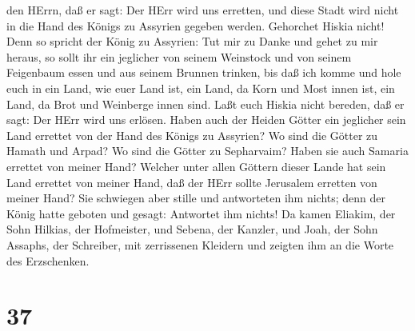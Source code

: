 den HErrn, daß er sagt: Der HErr wird uns erretten, und diese Stadt wird
nicht in die Hand des Königs zu Assyrien gegeben werden. 
Gehorchet Hiskia nicht! Denn so spricht der König zu Assyrien: Tut mir
zu Danke und gehet zu mir heraus, so sollt ihr ein jeglicher von seinem
Weinstock und von seinem Feigenbaum essen und aus seinem Brunnen
trinken,  bis daß ich komme und hole euch in ein Land, wie
euer Land ist, ein Land, da Korn und Most innen ist, ein Land, da Brot
und Weinberge innen sind.  Laßt euch Hiskia nicht bereden,
daß er sagt: Der HErr wird uns erlösen. Haben auch der Heiden Götter ein
jeglicher sein Land errettet von der Hand des Königs zu Assyrien?
 Wo sind die Götter zu Hamath und Arpad? Wo sind die Götter
zu Sepharvaim? Haben sie auch Samaria errettet von meiner Hand?
 Welcher unter allen Göttern dieser Lande hat sein Land
errettet von meiner Hand, daß der HErr sollte Jerusalem erretten von
meiner Hand?  Sie schwiegen aber stille und antworteten ihm
nichts; denn der König hatte geboten und gesagt: Antwortet ihm nichts!
 Da kamen Eliakim, der Sohn Hilkias, der Hofmeister, und
Sebena, der Kanzler, und Joah, der Sohn Assaphs, der Schreiber, mit
zerrissenen Kleidern und zeigten ihm an die Worte des Erzschenken.

\hypertarget{section-36}{%
\section{37}\label{section-36}}


